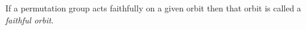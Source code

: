 If a permutation group acts faithfully on a given orbit then that orbit is called a \textit{faithful orbit}.
